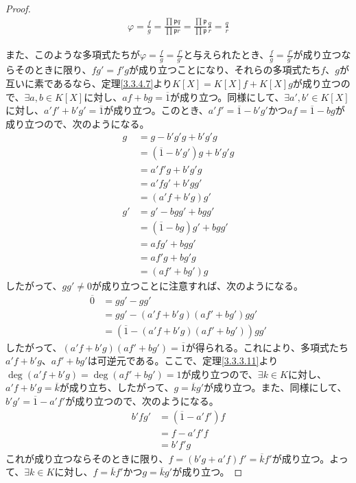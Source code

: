 \documentclass[dvipdfmx]{jsarticle}
\begin{document}
\begin{proof}
\begin{align*}
\varphi = \frac{f}{g} = \frac{\prod_{} \mathfrak{p}q}{\prod_{} \mathfrak{p}r} = \frac{\prod_{} \mathfrak{p}}{\prod_{} \mathfrak{p}}\frac{q}{r} = \frac{q}{r}
\end{align*}\par
また、このような多項式たちが$\varphi = \frac{f}{g} = \frac{f'}{g'}$と与えられたとき、$\frac{f}{g} = \frac{f'}{g'}$が成り立つならそのときに限り、$fg' = f'g$が成り立つことになり、それらの多項式たち$f$、$g$が互いに素であるなら、定理\ref{3.3.4.7}より$K[ X] = K[ X] f + K[ X] g$が成り立つので、$\exists a,b \in K[ X]$に対し、$af + bg = \overline{1}$が成り立つ。同様にして、$\exists a',b' \in K[ X]$に対し、$a'f' + b'g' = \overline{1}$が成り立つ。このとき、$a'f' = \overline{1} - b'g'$かつ$af = \overline{1} - bg$が成り立つので、次のようになる。
\begin{align*}
g &= g - b'g'g + b'g'g\\
&= \left( \overline{1} - b'g' \right)g + b'g'g\\
&= a'f'g + b'g'g\\
&= a'fg' + b'gg'\\
&= \left( a'f + b'g \right)g'\\
g' &= g' - bgg' + bgg'\\
&= \left( \overline{1} - bg \right)g' + bgg'\\
&= afg' + bgg'\\
&= af'g + bg'g\\
&= \left( af' + bg' \right)g
\end{align*}
したがって、$gg' \neq 0$が成り立つことに注意すれば、次のようになる。
\begin{align*}
\overline{0} &= gg' - gg'\\
&= gg' - \left( a'f + b'g \right)\left( af' + bg' \right)gg'\\
&= \left( \overline{1} - \left( a'f + b'g \right)\left( af' + bg' \right) \right)gg'
\end{align*}
したがって、$\left( a'f + b'g \right)\left( af' + bg' \right) = \overline{1}$が得られる。これにより、多項式たち$a'f + b'g$、$af' + bg'$は可逆元である。ここで、定理\ref{3.3.3.11}より$\deg\left( a'f + b'g \right) = \deg\left( af' + bg' \right) = 1$が成り立つので、$\exists k \in K$に対し、$a'f + b'g = \overline{k}$が成り立ち、したがって、$g = \overline{k}g'$が成り立つ。また、同様にして、$b'g' = \overline{1} - a'f'$が成り立つので、次のようになる。
\begin{align*}
b'fg' &= \left( \overline{1} - a'f' \right)f\\
&= f - a'f'f\\
&= b'f'g
\end{align*}
これが成り立つならそのときに限り、$f = \left( b'g + a'f \right)f' = \overline{k}f'$が成り立つ。よって、$\exists k \in K$に対し、$f = \overline{k}f'$かつ$g = \overline{k}g'$が成り立つ。
\end{proof}
\end{document}
